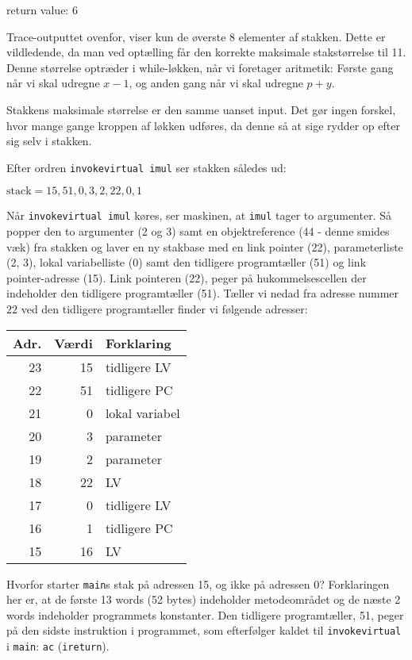 \documentclass[12pt,a4paper]{article}
\newcommand{\imul}{\texttt{imul}}
\begin{document}
return value: 6

Trace-outputtet ovenfor, viser kun de øverste 8 elementer af stakken. Dette er
vildledende, da man ved optælling får den korrekte maksimale stakstørrelse til
11. Denne størrelse optræder i while-løkken, når vi foretager aritmetik: Første
gang når vi skal udregne $x-1$, og anden gang når vi skal udregne $p+y$.

Stakkens maksimale størrelse er den samme uanset input. Det gør ingen forskel,
hvor mange gange kroppen af løkken udføres, da denne så at sige rydder op efter
sig selv i stakken.

Efter ordren \texttt{invokevirtual imul} ser stakken således ud:

$\text{stack} = 15, 51, 0, 3, 2, 22, 0, 1$

Når \texttt{invokevirtual imul} køres, ser maskinen, at \imul{} tager to
argumenter. Så popper den to argumenter (2 og 3) samt en objektreference (44 -
denne smides væk) fra stakken og laver en ny stakbase med en link pointer (22),
parameterliste (2, 3), lokal variabelliste (0) samt den tidligere programtæller
(51) og link pointer-adresse (15).  Link pointeren (22), peger på
hukommelsescellen der indeholder den tidligere programtæller (51).  Tæller vi
nedad fra adresse nummer $22$ ved den tidligere programtæller finder vi
følgende adresser:

\begin{tabular}{|r|r|l|}
	\hline
	Adr. & Værdi & Forklaring \\
	\hline
	23 & 15 & tidligere LV \\
	22 & 51 & tidligere PC \\
	21 & 0 & lokal variabel \\
	20 & 3 & parameter \\
	19 & 2 & parameter \\
	18 & 22 & LV \\
	\hline
	17 & 0 & tidligere LV \\
	16 & 1 & tidligere PC \\
	15 & 16 & LV \\
	\hline
\end{tabular}

Hvorfor starter \texttt{main}s stak på adressen 15, og ikke på adressen 0?
Forklaringen her er, at de første 13 words (52 bytes) indeholder metodeområdet
og de næste 2 words indeholder programmets konstanter. Den tidligere
programtæller, 51, peger på den sidste instruktion i programmet, som
efterfølger kaldet til \texttt{invokevirtual} i \texttt{main}: \texttt{ac}
(\texttt{ireturn}).
\end{document}

